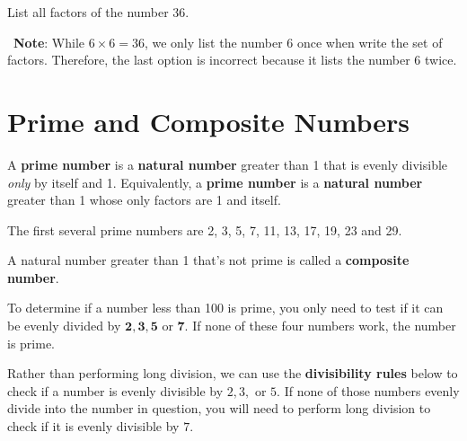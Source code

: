 \documentclass{ximera}[font=12pt]  %
\begin{document}
\begin{problem}
List all factors of the number 36.
\begin{multipleChoice}
\end{multipleChoice}
\begin{feedback}
    \, \textbf{Note}:  While $6 \times 6 = 36$, we only list the number 6 once when 
    write the set of factors.  Therefore, the last
    option is incorrect because it lists the number 6 twice.
\end{feedback}
\end{problem}


\section*{Prime and Composite Numbers}

\begin{definition}

A \textbf{prime number} is a \textbf{natural number} greater than 1 that is evenly
divisible \emph{only} by itself and 1.  Equivalently, a \textbf{prime number} is a \textbf{natural number} greater
than 1 whose only factors are 1 and itself.

The first several prime numbers are 2, 3, 5, 7, 11, 13, 17, 19, 23 and 29. 

A natural number greater than 1 that's not prime is called a \textbf{composite number}.

\end{definition}

\begin{procedure}

To determine if a number less than 100 is prime, you only need to test if it can be evenly divided by $\mathbf{2, 3, 5}$ or $\mathbf{7}.$ 
If none of these four numbers work, the number is prime.

\end{procedure} 

Rather than performing long division, we can use the \textbf{divisibility rules} below to check if a number is evenly 
divisible by $2, 3,$ or $5$.  If none of those numbers evenly divide into the number in question, you will 
need to perform long division to check if it is evenly divisible by $7$.  
\end{document}
